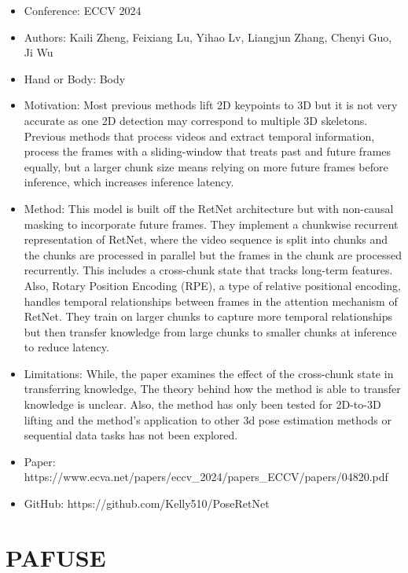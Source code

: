 \documentclass{article}
\begin{document}
\begin{itemize}
    \item Conference: ECCV 2024
    \item Authors: Kaili Zheng, Feixiang Lu, Yihao Lv, Liangjun Zhang, Chenyi Guo, Ji Wu
    \item Hand or Body: Body
    \item Motivation: Most previous methods lift 2D keypoints to 3D but it is not very accurate as one 2D detection may correspond to multiple 3D skeletons. Previous methods that process videos and extract temporal information, process the frames with a sliding-window that treats past and future frames equally, but a larger chunk size means relying on more future frames before inference, which increases inference latency.
    \item Method: This model is built off the RetNet architecture but with non-causal masking to incorporate future frames. They implement a chunkwise recurrent representation of RetNet, where the video sequence is split into chunks and the chunks are processed in parallel but the frames in the chunk are processed recurrently. This includes a cross-chunk state that tracks long-term features. Also, Rotary Position Encoding (RPE), a type of relative positional encoding, handles temporal relationships between frames in the attention mechanism of RetNet. They train on larger chunks to capture more temporal relationships but then transfer knowledge from large chunks to smaller chunks at inference to reduce latency.
    \item Limitations: While, the paper examines the effect of the cross-chunk state in transferring knowledge, The theory behind how the method is able to transfer knowledge is unclear. Also, the method has only been tested for 2D-to-3D lifting and the method's application to other 3d pose estimation methods or sequential data tasks has not been explored.
    \item Paper: https://www.ecva.net/papers/eccv\_2024/papers\_ECCV/papers/04820.pdf
    \item GitHub: https://github.com/Kelly510/PoseRetNet
\end{itemize}

\section*{PAFUSE}
\end{document}
